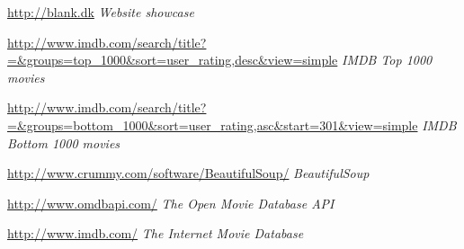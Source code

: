 \documentclass{acm_proc_article-sp}
\begin{document}


\begin{thebibliography}{9}

\url{http://blank.dk}
\textit{Website showcase}

\url{http://www.imdb.com/search/title?=&groups=top_1000&sort=user_rating,desc&view=simple}
\textit{IMDB Top 1000 movies}

\url{http://www.imdb.com/search/title?=&groups=bottom_1000&sort=user_rating,asc&start=301&view=simple}
\textit{IMDB Bottom 1000 movies}

\url{http://www.crummy.com/software/BeautifulSoup/}
\textit{BeautifulSoup}

\url{http://www.omdbapi.com/}
\textit{The Open Movie Database API}

\url{http://www.imdb.com/}
\textit{The Internet Movie Database}

\end{thebibliography}
\end{document}
